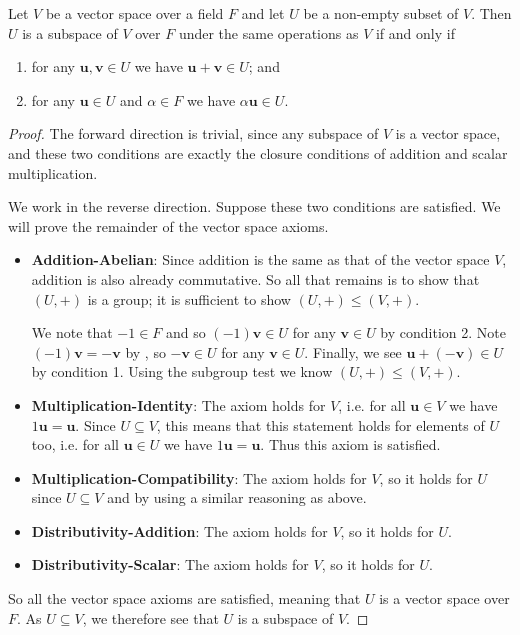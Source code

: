 \begin{theorem}\label{thrm-subspace-test}
    Let $V$ be a vector space over a field $F$ and let $U$ be a non-empty subset of $V$. Then $U$ is a subspace of $V$ over $F$ under the same operations as $V$ if and only if
    \begin{enumerate}
        \item for any $\mathbf{u}, \mathbf{v} \in U$ we have $\mathbf{u} + \mathbf{v} \in U$; and
        \item for any $\mathbf{u} \in U$ and $\alpha \in F$ we have $\alpha\mathbf{u} \in U$.
    \end{enumerate}
\end{theorem}
\begin{proof}
    The forward direction is trivial, since any subspace of $V$ is a vector space, and these two conditions are exactly the closure conditions of addition and scalar multiplication.

    We work in the reverse direction. Suppose these two conditions are satisfied. We will prove the remainder of the vector space axioms.
    \begin{itemize}
        \item \textbf{Addition-Abelian}: Since addition is the same as that of the vector space $V$, addition is also already commutative. So all that remains is to show that $(U, +)$ is a group; it is sufficient to show $(U, +) \leq (V, +)$.

        We note that $-1 \in F$ and so $(-1)\mathbf{v} \in U$ for any $\mathbf{v} \in U$ by condition 2. Note $(-1)\mathbf{v} = -\mathbf{v}$ by , so $-\mathbf{v} \in U$ for any $\mathbf{v} \in U$. Finally, we see $\mathbf{u} + (-\mathbf{v}) \in U$ by condition 1. Using the subgroup test we know $(U, +) \leq (V, +)$.

        \item \textbf{Multiplication-Identity}: The axiom holds for $V$, i.e. for all $\mathbf{u} \in V$ we have $1\mathbf{u} = \mathbf{u}$. Since $U \subseteq V$, this means that this statement holds for elements of $U$ too, i.e. for all $\mathbf{u} \in U$ we have $1\mathbf{u} = \mathbf{u}$. Thus this axiom is satisfied.

        \item \textbf{Multiplication-Compatibility}: The axiom holds for $V$, so it holds for $U$ since $U \subseteq V$ and by using a similar reasoning as above.

        \item \textbf{Distributivity-Addition}: The axiom holds for $V$, so it holds for $U$.

        \item \textbf{Distributivity-Scalar}: The axiom holds for $V$, so it holds for $U$.
    \end{itemize}
    So all the vector space axioms are satisfied, meaning that $U$ is a vector space over $F$. As $U \subseteq V$, we therefore see that $U$ is a subspace of $V$.
\end{proof}
